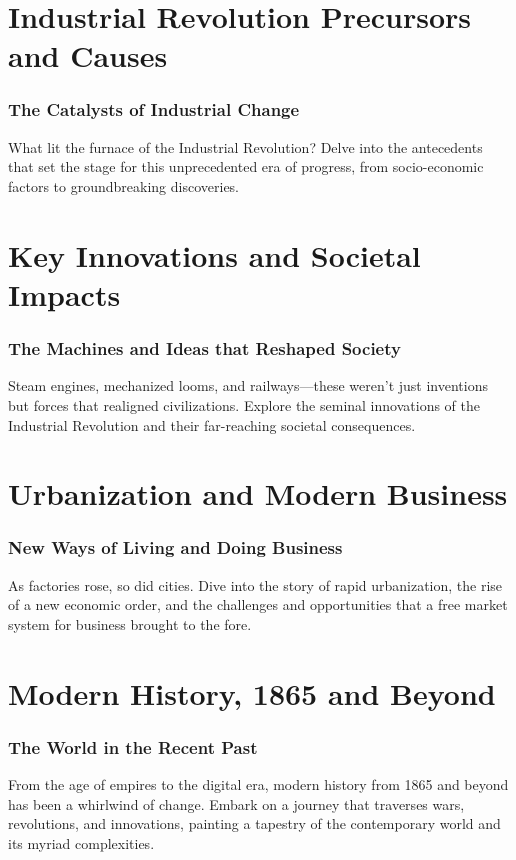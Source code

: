\documentclass[a4paper,12pt]{book}
\begin{document}
\chapter{Industrial Revolution Precursors and Causes}
\subsection*{The Catalysts of Industrial Change}
What lit the furnace of the Industrial Revolution? Delve into the antecedents that set the stage for this unprecedented era of progress, from socio-economic factors to groundbreaking discoveries.

\chapter{Key Innovations and Societal Impacts}
\subsection*{The Machines and Ideas that Reshaped Society}
Steam engines, mechanized looms, and railways—these weren't just inventions but forces that realigned civilizations. Explore the seminal innovations of the Industrial Revolution and their far-reaching societal consequences.

\chapter{Urbanization and Modern Business}
\subsection*{New Ways of Living and Doing Business}
As factories rose, so did cities. Dive into the story of rapid urbanization, the rise of a new economic order, and the challenges and opportunities that a free market system for business brought to the fore.

\chapter{Modern History, 1865 and Beyond}
\subsection*{The World in the Recent Past}
From the age of empires to the digital era, modern history from 1865 and beyond has been a whirlwind of change. Embark on a journey that traverses wars, revolutions, and innovations, painting a tapestry of the contemporary world and its myriad complexities.
\end{document}
